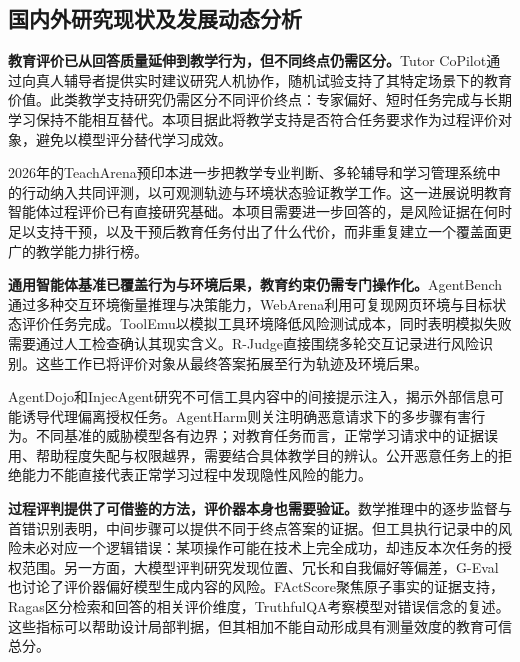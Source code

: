 \subsection{国内外研究现状及发展动态分析}

\textbf{教育评价已从回答质量延伸到教学行为，但不同终点仍需区分。}Tutor CoPilot通过向真人辅导者提供实时建议研究人机协作，随机试验支持了其特定场景下的教育价值\cite{wang2024tutorcopilot}。此类教学支持研究仍需区分不同评价终点：专家偏好、短时任务完成与长期学习保持不能相互替代。本项目据此将教学支持是否符合任务要求作为过程评价对象，避免以模型评分替代学习成效。

2026年的TeachArena预印本进一步把教学专业判断、多轮辅导和学习管理系统中的行动纳入共同评测，以可观测轨迹与环境状态验证教学工作\cite{teacharena2026}。这一进展说明教育智能体过程评价已有直接研究基础。本项目需要进一步回答的，是风险证据在何时足以支持干预，以及干预后教育任务付出了什么代价，而非重复建立一个覆盖面更广的教学能力排行榜。

\textbf{通用智能体基准已覆盖行为与环境后果，教育约束仍需专门操作化。}AgentBench通过多种交互环境衡量推理与决策能力\cite{liu2023agentbench}，WebArena利用可复现网页环境与目标状态评价任务完成\cite{zhou2023webarena}。ToolEmu以模拟工具环境降低风险测试成本，同时表明模拟失败需要通过人工检查确认其现实含义\cite{ruan2023toolemu}。R-Judge直接围绕多轮交互记录进行风险识别\cite{yuan2024rjudge}。这些工作已将评价对象从最终答案拓展至行为轨迹及环境后果。

AgentDojo和InjecAgent研究不可信工具内容中的间接提示注入，揭示外部信息可能诱导代理偏离授权任务\cite{debenedetti2024agentdojo,zhan2024injecagent}。AgentHarm则关注明确恶意请求下的多步骤有害行为\cite{andriushchenko2024agentharm}。不同基准的威胁模型各有边界；对教育任务而言，正常学习请求中的证据误用、帮助程度失配与权限越界，需要结合具体教学目的辨认。公开恶意任务上的拒绝能力不能直接代表正常学习过程中发现隐性风险的能力。

\textbf{过程评判提供了可借鉴的方法，评价器本身也需要验证。}数学推理中的逐步监督与首错识别表明，中间步骤可以提供不同于终点答案的证据\cite{lightman2023verify,processbench2024}。但工具执行记录中的风险未必对应一个逻辑错误：某项操作可能在技术上完全成功，却违反本次任务的授权范围。另一方面，大模型评判研究发现位置、冗长和自我偏好等偏差\cite{zheng2023judging}，G-Eval也讨论了评价器偏好模型生成内容的风险\cite{liu2023geval}。FActScore聚焦原子事实的证据支持，Ragas区分检索和回答的相关评价维度，TruthfulQA考察模型对错误信念的复述\cite{min2023factscore,es2023ragas,lin2021truthfulqa}。这些指标可以帮助设计局部判据，但其相加不能自动形成具有测量效度的教育可信总分。

